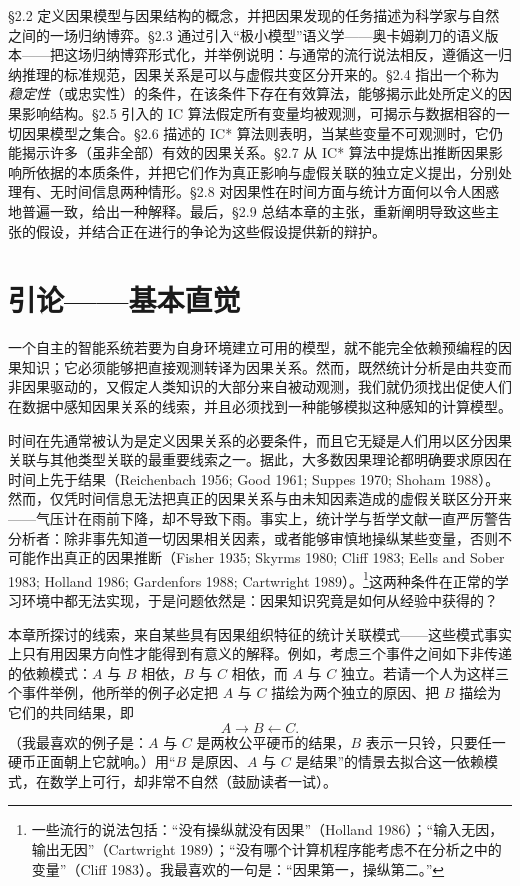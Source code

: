 \S 2.2 定义因果模型与因果结构的概念，并把因果发现的任务描述为科学家与自然之间的一场归纳博弈。\S 2.3 通过引入“极小模型”语义学——奥卡姆剃刀的语义版本——把这场归纳博弈形式化，并举例说明：与通常的流行说法相反，遵循这一归纳推理的标准规范，因果关系是可以与虚假共变区分开来的。\S 2.4 指出一个称为\emph{稳定性}（或忠实性）的条件，在该条件下存在有效算法，能够揭示此处所定义的因果影响结构。\S 2.5 引入的 IC 算法假定所有变量均被观测，可揭示与数据相容的一切因果模型之集合。\S 2.6 描述的 IC* 算法则表明，当某些变量不可观测时，它仍能揭示许多（虽非全部）有效的因果关系。\S 2.7 从 IC* 算法中提炼出推断因果影响所依据的本质条件，并把它们作为真正影响与虚假关联的独立定义提出，分别处理有、无时间信息两种情形。\S 2.8 对因果性在时间方面与统计方面何以令人困惑地普遍一致，给出一种解释。最后，\S 2.9 总结本章的主张，重新阐明导致这些主张的假设，并结合正在进行的争论为这些假设提供新的辩护。

\section{引论——基本直觉}

一个自主的智能系统若要为自身环境建立可用的模型，就不能完全依赖预编程的因果知识；它必须能够把直接观测转译为因果关系。然而，既然统计分析是由共变而非因果驱动的，又假定人类知识的大部分来自被动观测，我们就仍须找出促使人们在数据中感知因果关系的线索，并且必须找到一种能够模拟这种感知的计算模型。

时间在先通常被认为是定义因果关系的必要条件，而且它无疑是人们用以区分因果关联与其他类型关联的最重要线索之一。据此，大多数因果理论都明确要求原因在时间上先于结果（Reichenbach 1956; Good 1961; Suppes 1970; Shoham 1988）。然而，仅凭时间信息无法把真正的因果关系与由未知因素造成的虚假关联区分开来——气压计在雨前下降，却不导致下雨。事实上，统计学与哲学文献一直严厉警告分析者：除非事先知道一切因果相关因素，或者能够审慎地操纵某些变量，否则不可能作出真正的因果推断（Fisher 1935; Skyrms 1980; Cliff 1983; Eells and Sober 1983; Holland 1986; Gardenfors 1988; Cartwright 1989）。\footnote{一些流行的说法包括：“没有操纵就没有因果”（Holland 1986）；“输入无因，输出无因”（Cartwright 1989）；“没有哪个计算机程序能考虑不在分析之中的变量”（Cliff 1983）。我最喜欢的一句是：“因果第一，操纵第二。”}这两种条件在正常的学习环境中都无法实现，于是问题依然是：因果知识究竟是如何从经验中获得的？

本章所探讨的线索，来自某些具有因果组织特征的统计关联模式——这些模式事实上只有用因果方向性才能得到有意义的解释。例如，考虑三个事件之间如下非传递的依赖模式：$A$ 与 $B$ 相依，$B$ 与 $C$ 相依，而 $A$ 与 $C$ 独立。若请一个人为这样三个事件举例，他所举的例子必定把 $A$ 与 $C$ 描绘为两个独立的原因、把 $B$ 描绘为它们的共同结果，即
\[
A\to B\leftarrow C .
\]
（我最喜欢的例子是：$A$ 与 $C$ 是两枚公平硬币的结果，$B$ 表示一只铃，只要任一硬币正面朝上它就响。）用“$B$ 是原因、$A$ 与 $C$ 是结果”的情景去拟合这一依赖模式，在数学上可行，却非常不自然（鼓励读者一试）。

